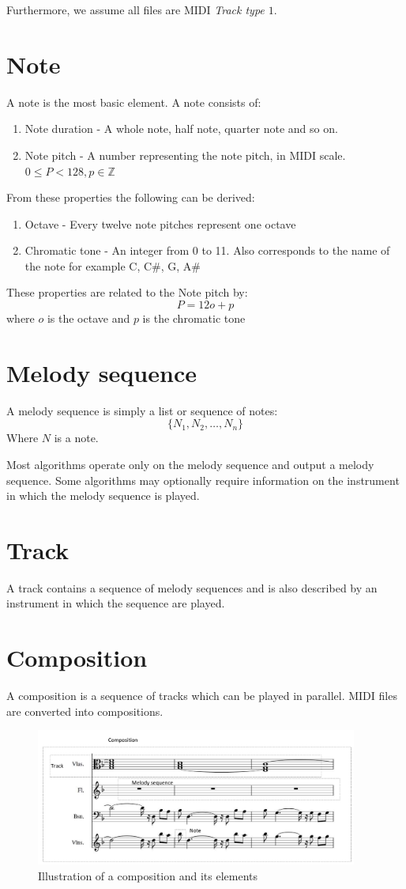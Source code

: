 Furthermore, we assume all files are \ac{MIDI} \emph{Track type $1$}.

\section{Note}
A note is the most basic element. A note consists of:
\begin{enumerate}
\item Note duration - A whole note, half note, quarter note and so on.
\item Note pitch - A number representing the note pitch, in MIDI scale. $0 \leq P < 128, p \in \mathbb{Z}$
\end{enumerate}

From these properties the following can be derived:
\begin{enumerate}
\item Octave - Every twelve note pitches represent one octave
\item Chromatic tone - An integer from 0 to 11. Also corresponds to the name of the note for example C, C\#, G, A\#
\end{enumerate}
These properties are related to the Note pitch by:
\[P = 12o + p \]
where $o$ is the octave and $p$ is the chromatic tone

\section{Melody sequence}
A melody sequence is simply a list or sequence of notes:
\[\{N_1, N_2, \ldots, N_n\} \]
Where $N$ is a note.

Most algorithms operate only on the melody sequence and output a melody sequence. Some algorithms may optionally require information on the instrument in which the melody sequence is played.

\section{Track}
A track contains a sequence of melody sequences and is also described by an instrument in which the sequence are played.

\section{Composition}
A composition is a sequence of tracks which can be played in parallel. 
MIDI files are converted into compositions.

\begin{figure}
\centerline{\includegraphics[width=400px]{../images/composition_illustration.pdf}}
\caption{Illustration of a composition and its elements}
\label{ims:compillu}
\end{figure}

